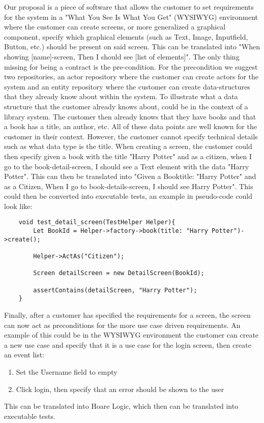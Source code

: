 Our proposal is a piece of software that allows the customer to set requirements for the system in a "What You See Is What You Get" (WYSIWYG) environment where the customer can create screens, or more generalized a graphical component, specify which graphical elements (such as Text, Image, Inputfield, Button, etc.) should be present on said screen. 
This can be translated into "When showing [name]-screen, Then I should see [list of elements]".
The only thing missing for being a contract is the pre-condition.
For the precondition we suggest two repositories, an actor repository where the customer can create actors for the system and an entity repository where the customer can create data-structures that they already know about within the system. 
To illustrate what a data structure that the customer already knows about, could be in the context of a library system.
The customer then already knows that they have books and that a book has a title, an author, etc. 
All of these data points are well known for the customer in their context. 
However, the customer cannot specify technical details such as what data type is the title.
When creating a screen, the customer could then specify given a book with the title "Harry Potter" and as a citizen, when I go to the book-detail-screen, I should see a Text element with the data "Harry Potter". 
This can then be translated into "Given a Book{title: "Harry Potter"} and as a Citizen, When I go to book-details-screen, I should see Harry Potter".
This could then be converted into executable tests, an example in pseudo-code could look like:

\begin{lstlisting}
    void test_detail_screen(TestHelper Helper){
        Let BookId = Helper->factory->book(title: "Harry Potter")->create();

        Helper->ActAs("Citizen");

        Screen detailScreen = new DetailScreen(BookId);

        assertContains(detailScreen, "Harry Potter");
    }
\end{lstlisting}

Finally, after a customer has specified the requirements for a screen, the screen can now act as preconditions for the more use case driven requirements. 
An example of this could be in the WYSIWYG environment the customer can create a new use case and specify that it is a use case for the login screen, then create an event list: 
\begin{enumerate}
    \item Set the Username field to empty
    \item Click login, then specify that an error should be shown to the user
\end{enumerate}

This can be translated into Hoare Logic, which then can be translated into executable tests.
